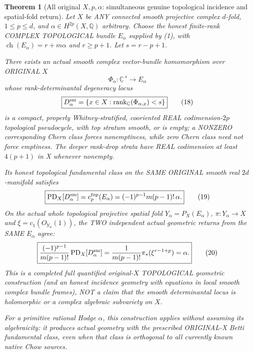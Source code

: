 \documentclass[11pt]{article}
\newtheorem{theorem}{Theorem}
\begin{document}
\begin{theorem}[All original $X,p,\alpha$: simultaneous genuine topological incidence and spatial-fold return]
Let $X$ be ANY connected smooth projective complex
$d$-fold, $1\le p\le d$, and
$\alpha\in H^{2p}(X,\mathbb Q)$ arbitrary.
Choose the honest finite-rank COMPLEX TOPOLOGICAL
bundle $E_\alpha$ supplied by (1),
with
$\operatorname{ch}(E_\alpha)
=r+m\alpha$ and $r\ge p+1$.
Let $s=r-p+1$.

There exists an actual smooth complex vector-bundle
homomorphism over ORIGINAL $X$
\[
 \boxed{
 \Phi_\alpha:\underline{\mathbb C}^{\,s}
                    \longrightarrow E_\alpha
 }
\]
whose rank-determinantal degeneracy locus
\[
 \boxed{
 D_\alpha^{\rm sm}=
 \{x\in X:\operatorname{rank}_{\mathbb C}
                         (\Phi_{\alpha,x})<s\}
 }                                                        \tag{18}
\]
is a compact, properly Whitney-stratified,
cooriented REAL codimension-$2p$
topological pseudocycle, with top stratum
smooth, or is empty; a NONZERO corresponding
Chern class forces nonemptiness, while
zero Chern class need not force emptiness.
The deeper rank-drop
strata have REAL codimension at least
$4(p+1)$ in X whenever nonempty.

Its honest topological
fundamental class on the SAME ORIGINAL
smooth real $2d$-manifold satisfies
\[
 \boxed{
 \operatorname{PD}_X[D_\alpha^{\rm sm}]
   =c_p^{top}(E_\alpha)
   =(-1)^{p-1}m(p-1)!\,\alpha .
 }                                                       \tag{19}
\]
On the actual whole topological projective
spatial fold $Y_\alpha=P_X(E_\alpha)$,
$\pi:Y_\alpha\to X$ and
$\xi=c_1(O_{Y_\alpha}(1))$,
the TWO independent actual geometric
returns from the SAME $E_\alpha$ agree:
\[
 \boxed{
 \frac{(-1)^{p-1}}{m(p-1)!}
    \operatorname{PD}_X[D_\alpha^{\rm sm}]
   =\frac{1}{m(p-1)!}
        \pi_*(\xi^{r-1+p})
   =\alpha .
 }                                                       \tag{20}
\]
This is a completed full quantified
original-$X$ TOPOLOGICAL geometric
construction (and an honest incidence
geometry with equations in local smooth
complex bundle frames), NOT a claim that
the smooth determinantal locus is
holomorphic or a complex algebraic
subvariety on $X$.

For a primitive rational Hodge
$\alpha$, this construction applies
without assuming its algebraicity:
it produces actual geometry with
the prescribed ORIGINAL-X Betti
fundamental class, even when that
class is orthogonal to all currently
known native Chow sources.
\end{theorem}
\end{document}
